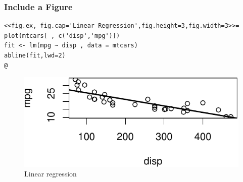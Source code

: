 \documentclass[10pt]{beamer}\usepackage[]{graphicx}\usepackage[]{color}
\makeatletter
\def\maxwidth{ %
  \ifdim\Gin@nat@width>\linewidth
    \linewidth
  \else
    \Gin@nat@width
  \fi
}
\newenvironment{kframe}{%
 \def\at@end@of@kframe{}%
 \ifinner\ifhmode%
  \def\at@end@of@kframe{\end{minipage}}%
  \begin{minipage}{\columnwidth}%
 \fi\fi%
 \def\FrameCommand##1{\hskip\@totalleftmargin \hskip-\fboxsep
 \colorbox{shadecolor}{##1}\hskip-\fboxsep
     \hskip-\linewidth \hskip-\@totalleftmargin \hskip\columnwidth}%
 \MakeFramed {\advance\hsize-\width
   \@totalleftmargin\z@ \linewidth\hsize
   \@setminipage}}%
 {\par\unskip\endMakeFramed%
 \at@end@of@kframe}
\newenvironment{knitrout}{}{} %
\makeatother
\begin{document}
\begin{frame}[fragile]
\frametitle{Include a Figure}
\scriptsize
\begin{knitrout}
\color{fgcolor}\begin{kframe}
\begin{verbatim}
<<fig.ex, fig.cap='Linear Regression',fig.height=3,fig.width=3>>=
plot(mtcars[ , c('disp','mpg')])
fit <- lm(mpg ~ disp , data = mtcars)
abline(fit,lwd=2)
@
\end{verbatim}
\end{kframe}
\end{knitrout}
\begin{knitrout}
\color{fgcolor}\begin{figure}

{\centering \includegraphics[width=\maxwidth]{figure/slr7-1} 

}

\caption[Linear regression]{Linear regression}\label{fig:slr7}
\end{figure}


\end{knitrout}
\end{frame}
\end{document}

